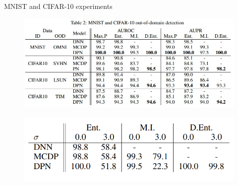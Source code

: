 \documentclass{beamer}
\begin{document}
\begin{frame}{MNIST and CIFAR-10 experiments}
    \begin{figure}[h]
        \includegraphics[scale=0.5]{images/table2.jpg}
     \end{figure}
    \begin{figure}[h]
        \includegraphics[scale=0.35]{images/table3.png}
     \end{figure}
\end{frame}
\end{document}
